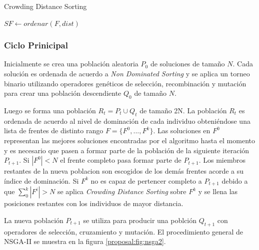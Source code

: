 \begin{algorithm*}[ht]
    \caption{Crowding Distance Sorting}
    \label{proposal:alg:cd}


    $SF \gets ordenar(F, dist)$ 
\end{algorithm*}

\subsubsection{Ciclo Prinicipal}
Inicialmente se crea una poblaci\'on aleatoria $P_0$ de soluciones de tama\~no $N$. Cada soluci\'on es ordenada de acuerdo a \textit{Non Dominated Sorting} y se aplica un torneo binario utilizando operadores gen\'eticos de selecci\'on, recombinaci\'on y mutaci\'on para crear una poblaci\'on descendiente $Q_0$ de tama\~no $N$.

Luego se forma una poblaci\'on $R_t = P_t \cup Q_t$ de tama\~no 2N. La poblaci\'on $R_t$ es ordenada de acuerdo al nivel de dominaci\'on de cada individuo obteni\'endose una lista de frentes de distinto rango $F = \{F^0, ..., F^k\}$. Las soluciones en $F^0$ representan las mejores soluciones encontradas por el algoritmo hasta el momento y es necesario que pasen a formar parte de la poblaci\'on de la siguiente iteraci\'on $P_{t+1}$. Si $|F^0| < N$ el frente completo pasa formar parte de $P_{t+1}$. Los miembros restantes de la nueva poblacion son escogidos de los dem\'as frentes acorde a su \'indice de dominaci\'on. Si $F^k$ no es capaz de pertencer completo a $P_{t+1}$ debido a que $\sum_0^k |F^i| > N$ se aplica \textit{Crowding Distance Sorting} sobre $F^k$ y se llena las posiciones restantes con los individuos de mayor distancia.

La nueva poblaci\'on $P_{t+1}$ se utiliza para producir una poblci\'on $Q_{t+1}$ con operadores de selecci\'on, cruzamiento y mutaci\'on. El procedimiento general de NSGA-II se muestra en la figura \ref{proposal:fig:nsga2}.

